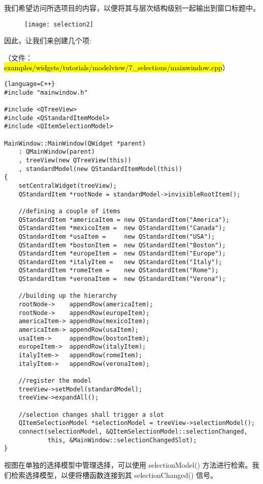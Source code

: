 我们希望访问所选项目的内容，以便将其与层次结构级别一起输出到窗口标题中。

\begin{figure}[hbt!]  
\texttt{[image: selection2]}
\end{figure}

因此，让我们来创建几个项:

（文件： \hl{examples/widgets/tutorials/modelview/7\_selections/mainwindow.cpp}）

\begin{lstlisting}{language=C++}
#include "mainwindow.h"

#include <QTreeView>
#include <QStandardItemModel>
#include <QItemSelectionModel>

MainWindow::MainWindow(QWidget *parent)
    : QMainWindow(parent)
    , treeView(new QTreeView(this))
    , standardModel(new QStandardItemModel(this))
{
    setCentralWidget(treeView);
    QStandardItem *rootNode = standardModel->invisibleRootItem();

    //defining a couple of items
    QStandardItem *americaItem = new QStandardItem("America");
    QStandardItem *mexicoItem =  new QStandardItem("Canada");
    QStandardItem *usaItem =     new QStandardItem("USA");
    QStandardItem *bostonItem =  new QStandardItem("Boston");
    QStandardItem *europeItem =  new QStandardItem("Europe");
    QStandardItem *italyItem =   new QStandardItem("Italy");
    QStandardItem *romeItem =    new QStandardItem("Rome");
    QStandardItem *veronaItem =  new QStandardItem("Verona");

    //building up the hierarchy
    rootNode->    appendRow(americaItem);
    rootNode->    appendRow(europeItem);
    americaItem-> appendRow(mexicoItem);
    americaItem-> appendRow(usaItem);
    usaItem->     appendRow(bostonItem);
    europeItem->  appendRow(italyItem);
    italyItem->   appendRow(romeItem);
    italyItem->   appendRow(veronaItem);

    //register the model
    treeView->setModel(standardModel);
    treeView->expandAll();

    //selection changes shall trigger a slot
    QItemSelectionModel *selectionModel = treeView->selectionModel();
    connect(selectionModel, &QItemSelectionModel::selectionChanged,
            this, &MainWindow::selectionChangedSlot);
}
\end{lstlisting}

视图在单独的选择模型中管理选择，可以使用 selectionModel() 方法进行检索。我们检索选择模型，以便将槽函数连接到其 selectionChanged() 信号。

